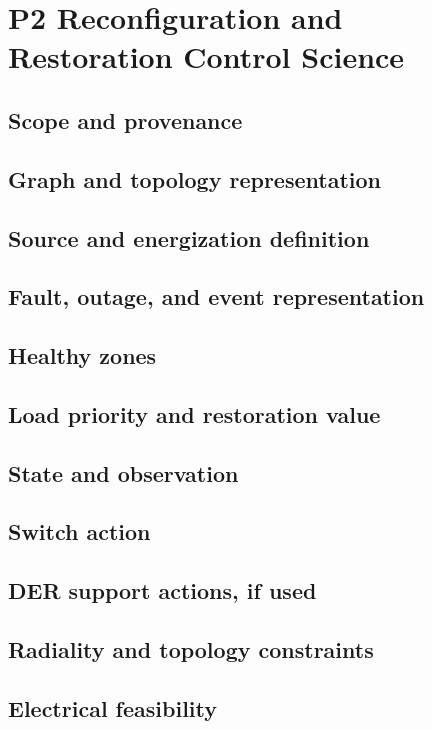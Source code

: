 
\section{P2 Reconfiguration and Restoration Control Science}

\subsection{Scope and provenance}
\subsection{Graph and topology representation}
\subsection{Source and energization definition}
\subsection{Fault, outage, and event representation}
\subsection{Healthy zones}
\subsection{Load priority and restoration value}
\subsection{State and observation}
\subsection{Switch action}
\subsection{DER support actions, if used}
\subsection{Radiality and topology constraints}
\subsection{Electrical feasibility}
